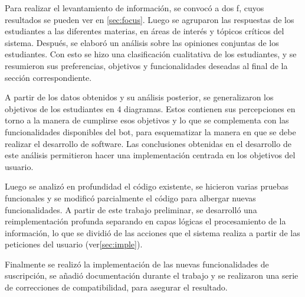     \par Para realizar el levantamiento de información, se convocó a dos \acrlong{f}, cuyos resultados se pueden ver en \ref{sec:focus}. Luego se agruparon las respuestas de los estudiantes a las diferentes materias, en áreas de interés y tópicos críticos del sistema. Después, se elaboró un análisis sobre las opiniones conjuntas de los estudiantes. Con esto se hizo una clasificación cualitativa de los estudiantes, y se resumieron sus preferencias, objetivos y funcionalidades deseadas al final de la sección correspondiente.

    \par A partir de los datos obtenidos y su análisis posterior, se generalizaron los objetivos de los estudiantes en 4 diagramas. Estos contienen sus percepciones en torno a la manera de  cumplirse esos objetivos y lo que se complementa con las funcionalidades disponibles del bot, para esquematizar la manera en que se debe realizar el desarrollo de software. Las conclusiones obtenidas en el desarrollo de este análisis permitieron hacer una implementación centrada en los objetivos del usuario.

    \par Luego se analizó en profundidad el código existente, se hicieron varias pruebas funcionales y se modificó parcialmente el código para albergar nuevas funcionalidades. A partir de este trabajo preliminar, se desarrolló una reimplementación profunda separando en capas lógicas el procesamiento de la información, lo que se dividió de las acciones que el sistema realiza a partir de las peticiones del usuario (ver\ref{sec:imple}).

    \par Finalmente se realizó la implementación de las nuevas funcionalidades de suscripción, se añadió documentación durante el trabajo y se realizaron una serie de correcciones de compatibilidad, para asegurar el resultado.

